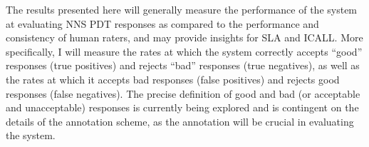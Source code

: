 \par
The results presented here will generally measure the performance of the system at evaluating NNS PDT responses as compared to the performance and consistency of human raters, and may provide insights for SLA and ICALL. More specifically, I will measure the rates at which the system correctly accepts ``good'' responses (true positives) and rejects ``bad'' responses (true negatives), as well as the rates at which it accepts bad responses (false positives) and rejects good responses (false negatives). The precise definition of good and bad (or acceptable and unacceptable) responses is currently being explored and is contingent on the details of the annotation scheme, as the annotation will be crucial in evaluating the system.
\\
\\
